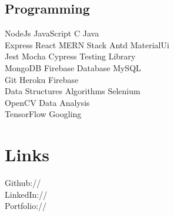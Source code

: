 \documentclass[]{deedy-resume-openfont}
\begin{document}
\begin{minipage}[t]{0.43\textwidth}
\subsection{Programming}
\textbullet{} NodeJs \textbullet{} JavaScript \textbullet{} C \textbullet{} Java\\ 
\textbullet{} Express \textbullet{} React \textbullet{} MERN Stack \textbullet{} Antd 
\textbullet{} MaterialUi\\
\textbullet{} Jest \textbullet{} Mocha \textbullet{} Cypress \textbullet{} Testing Library\\
MongoDB \textbullet{} Firebase Database \textbullet{} MySQL\\
\textbullet{} Git \textbullet{} Heroku \textbullet{} Firebase   \\
\textbullet{} Data Structures \textbullet{} Algorithms \textbullet{} Selenium\\ \textbullet{} OpenCV \textbullet{} Data Analysis\\ \textbullet{} TensorFlow \textbullet{} Googling\\

\vspace{5pt}
\section{Links} 
Github:// \href{https://github.com/mithlesh1203}{}\\
LinkedIn://  \href{https://www.linkedin.com/in/mithlesh-kumar-450a08160/}{} \\
Portfolio:// \href{https://mithleshkumar-portfolio.netlify.app/}{}


\end{minipage}
\end{document}

